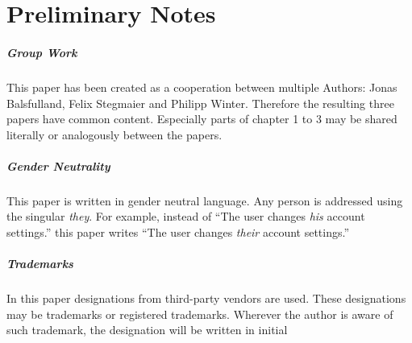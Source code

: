\clearpage
\chapter*{Preliminary Notes}
\thispagestyle{empty}

\paragraph{Group Work}
This paper has been created as a cooperation between multiple Authors: 
Jonas Balsfulland, Felix Stegmaier and Philipp Winter.
Therefore the resulting three papers have common content.
Especially parts of chapter 1 to 3 may be shared literally or analogously between the papers.



\paragraph{Gender Neutrality}
This paper is written in gender neutral language.
Any person is addressed using the singular \textit{they}.
For example, instead of 
``The user changes \textit{his} account settings.''
this paper writes 
``The user changes \textit{their} account settings.''

\paragraph{Trademarks}
In this paper designations from third-party vendors are used.
These designations may be trademarks or registered trademarks.
Wherever the author is aware of such trademark, the designation will be written in initial


